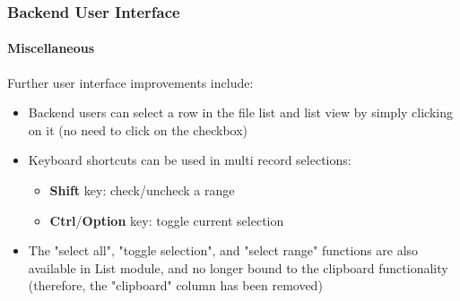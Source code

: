 %

\begin{frame}[fragile]
	\frametitle{Backend User Interface}
	\framesubtitle{Miscellaneous}

	Further user interface improvements include:

	\begin{itemize}
		\item Backend users can select a row in the file list and list view
			by simply clicking on it (no need to click on the checkbox)
		\item Keyboard shortcuts can be used in multi record selections:
			\begin{itemize}
				\item \textbf{Shift} key: check/uncheck a range
				\item \textbf{Ctrl}/\textbf{Option} key: toggle current selection
			\end{itemize}
		\item The "select all", "toggle selection", and "select range" functions
			are also available in List module, and no longer bound to the clipboard
			functionality (therefore, the "clipboard" column has been removed)
	\end{itemize}

\end{frame}

